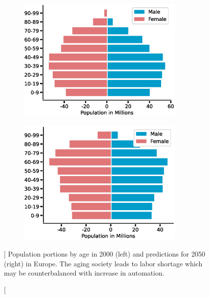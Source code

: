 \begin{figure}[h]
  \begin{subfigure}{0.5\textwidth}
    \centering
    \includegraphics[width=0.9\textwidth]{src/introduction/img/population_2000.eps}
  \end{subfigure}%
  \begin{subfigure}{0.5\textwidth}
    \centering
    \includegraphics[width=0.9\textwidth]{src/introduction/img/population_2050.eps}
  \end{subfigure}
  \caption
  []
  {
    Population portions by age in 2000 (left) and predictions for
    2050 (right) in Europe. The aging society leads to labor shortage
    which may be counterbalanced with increase in
    automation. \footnotemark
  }
\end{figure}


